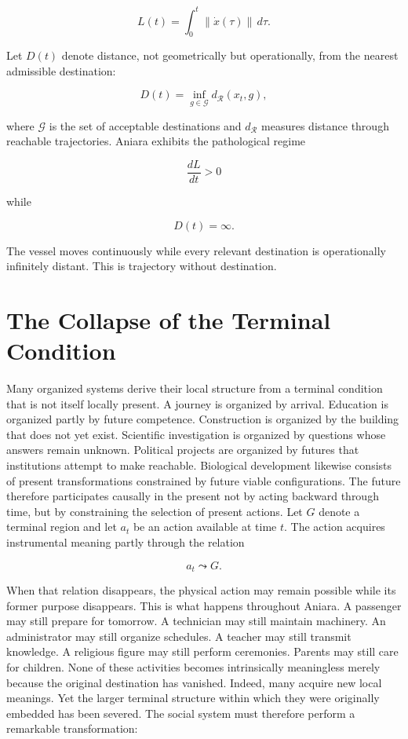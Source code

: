 \documentclass[11pt,oneside]{book}
\theoremstyle{definition}
\theoremstyle{remark}
\begin{document}
\[
L(t)=\int_0^t\|\dot{x}(\tau)\|\,d\tau.
\]

Let \(D(t)\) denote distance, not geometrically but operationally, from the nearest admissible
destination:

\[
D(t) = \inf_{g\in\mathcal{G}} d_{\mathcal{R}}(x_t,g),
\]

where \(\mathcal{G}\) is the set of acceptable destinations and \(d_{\mathcal{R}}\) measures
distance through reachable trajectories. Aniara exhibits the pathological regime

\[
\frac{dL}{dt}>0
\]

while

\[
D(t)=\infty.
\]

The vessel moves continuously while every relevant destination is operationally infinitely distant.
This is trajectory without destination.

\section{The Collapse of the Terminal Condition}

Many organized systems derive their local structure from a terminal condition that is not itself
locally present. A journey is organized by arrival. Education is organized partly by future
competence. Construction is organized by the building that does not yet exist. Scientific
investigation is organized by questions whose answers remain unknown. Political projects are
organized by futures that institutions attempt to make reachable. Biological development likewise
consists of present transformations constrained by future viable configurations. The future
therefore participates causally in the present not by acting backward through time, but by
constraining the selection of present actions. Let \(G\) denote a terminal region and let \(a_t\) be
an action available at time \(t\). The action acquires instrumental meaning partly through the
relation

\[
a_t\leadsto G.
\]

When that relation disappears, the physical action may remain possible while its former purpose
disappears. This is what happens throughout Aniara. A passenger may still prepare for tomorrow. A
technician may still maintain machinery. An administrator may still organize schedules. A teacher
may still transmit knowledge. A religious figure may still perform ceremonies. Parents may still
care for children. None of these activities becomes intrinsically meaningless merely because the
original destination has vanished. Indeed, many acquire new local meanings. Yet the larger terminal
structure within which they were originally embedded has been severed. The social system must
therefore perform a remarkable transformation:
\end{document}
